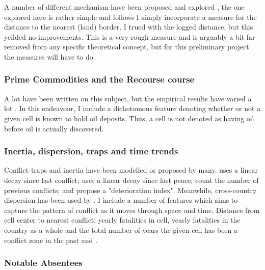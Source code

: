 \documentclass[a4paper]{article}
\begin{document}
A number of different mechanism have been proposed and explored \citep[29-30]{Blattman_Miguel_2010}, the one explored here is rather simple and follows \cite{Hegre_Sambanis_2006} I simply incorporate a measure for the distance to the nearest (land) border. I trued with the logged distance, but this yeilded no improvements. This is a very rough measure and is arguably a bit far removed from any specific theoretical concept, but for this preliminary project the measures will have to do.\par

\subsubsection{Prime Commodities and the Recourse course} %

A lot have been written on this subject, but the empirical results have varied a lot \citep{Collier_Hoeffler_1998, Fearon_Laitin_2003, Fearon_2004, Ross_2004, Collier_Hoeffler_2004, Fearon_2005, Buhaug_2010, Hegre_Oestby_Raleigh_2009}. In this endeavour, I include a dichotomous feature denoting whether or not a given cell is known to hold oil deposits. Thus, a cell is not denoted as having oil before oil is actually discovered.\par

\subsubsection{Inertia, dispersion, traps and time trends} %

Conflict traps and inertia have been modelled or proposed by many. \cite{Collier_Hoeffler_2004} uses a linear decay since last conflict; \cite{Hegre_Sambanis_2006} uses a linear decay since last peace; \cite{Cederman_Gleditsch_Buhaug_2013} count the number of previous conflicts; and \cite{perry_2013} propose a "deterioration index". Meanwhile, cross-country dispersion has been used by \cite{Goldstone_2010}. I include a number of features which aims to capture the pattern of conflict as it moves through space and time. Distance from cell center to nearest conflict, yearly fatalities in cell, yearly fatalities in the country as a whole and the total number of years the given cell has been a conflict zone in the past and .\par

\subsubsection{Notable Absentees}\label{notable_absentees} %
\end{document}
